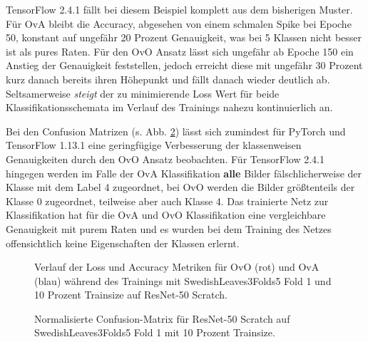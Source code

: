TensorFlow \cite{tensorflow} 2.4.1 fällt bei diesem Beispiel komplett aus dem bisherigen Muster. Für OvA bleibt die Accuracy, abgesehen von einem schmalen Spike bei Epoche 50, konstant auf ungefähr 20 Prozent Genauigkeit, was bei 5 Klassen nicht besser ist als pures Raten. Für den OvO Ansatz lässt sich ungefähr ab Epoche 150 ein Anstieg der Genauigkeit feststellen, jedoch erreicht diese mit ungefähr 30 Prozent kurz danach bereits ihren Höhepunkt und fällt danach wieder deutlich ab.
Seltsamerweise \textit{steigt} der zu minimierende Loss Wert für beide Klassifikationsschemata im Verlauf des Trainings nahezu kontinuierlich an.

Bei den Confusion Matrizen (s. Abb. \ref{fig:ConfusionMatrixB}) lässt sich zumindest für PyTorch \cite{pytorch} und TensorFlow \cite{tensorflow} 1.13.1 eine geringfügige Verbesserung der klassenweisen Genauigkeiten durch den OvO Ansatz beobachten. Für TensorFlow \cite{tensorflow} 2.4.1 hingegen werden im Falle der OvA Klassifikation \textbf{alle} Bilder fälschlicherweise der Klasse mit dem Label 4 zugeordnet, bei OvO werden die Bilder größtenteils der Klasse 0 zugeordnet, teilweise aber auch Klasse 4. Das trainierte Netz zur Klassifikation hat für die OvA und OvO Klassifikation eine vergleichbare Genauigkeit mit purem Raten und es wurden bei dem Training des Netzes offensichtlich keine Eigenschaften der Klassen erlernt.
\begin{figure}[H]
\begin{adjustbox}{width=1.4\textwidth, center}

\end{adjustbox}
\caption{Verlauf der Loss und Accuracy Metriken für OvO (rot) und OvA (blau) während des Trainings mit SwedishLeaves3Folds5 Fold 1 und 10 Prozent Trainsize auf ResNet-50 Scratch.}
\label{fig:TrainingsverlaufB}
\end{figure}

\begin{figure}[H]
\begin{adjustbox}{width=1.1\textwidth, center}

\end{adjustbox}
\caption{Normalisierte Confusion-Matrix für ResNet-50 Scratch auf SwedishLeaves3Folds5 Fold 1 mit 10 Prozent Trainsize.}
\label{fig:ConfusionMatrixB}
\end{figure}

